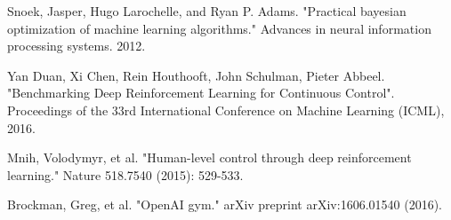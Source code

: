 \documentclass[final]{beamer}
\begin{document}
\begin{frame}[t]
\begin{multicols}{3}
\begin{thebibliography}{99}
 Snoek, Jasper, Hugo Larochelle, and Ryan P. Adams. "Practical bayesian optimization of machine learning algorithms." Advances in neural information processing systems. 2012.

 Yan Duan, Xi Chen, Rein Houthooft, John Schulman, Pieter Abbeel. "Benchmarking Deep Reinforcement Learning for Continuous Control". Proceedings of the 33rd International Conference on Machine Learning (ICML), 2016.

 Mnih, Volodymyr, et al. "Human-level control through deep reinforcement learning." Nature 518.7540 (2015): 529-533.

 Brockman, Greg, et al. "OpenAI gym." arXiv preprint arXiv:1606.01540 (2016).

\end{thebibliography}

\end{multicols}

\end{frame}
\end{document}
